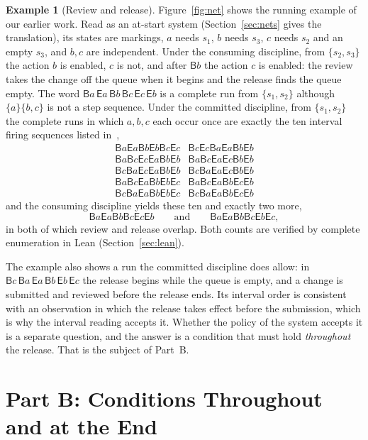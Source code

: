 \documentclass[preprint,12pt]{elsarticle}
\theoremstyle{plain}
\theoremstyle{definition}
\newtheorem{example}[theorem]{Example}
\newcommand{\B}[1]{\mathsf{B}#1}
\newcommand{\E}[1]{\mathsf{E}#1}
\begin{document}
\begin{example}[Review and release]
\label{ex:fig1}
Figure~\ref{fig:net} shows the running example of our earlier work. Read as an at-start system (Section~\ref{sec:nets} gives the translation), its states are markings, $a$ needs $s_1$, $b$ needs $s_3$, $c$ needs $s_2$ and an empty $s_3$, and $b, c$ are independent. Under the consuming discipline, from $\{s_2, s_3\}$ the action $b$ is enabled, $c$ is not, and after $\B{b}$ the action $c$ is enabled: the review takes the change off the queue when it begins and the release finds the queue empty. The word $\B{a}\,\E{a}\,\B{b}\,\B{c}\,\E{c}\,\E{b}$ is a complete run from $\{s_1, s_2\}$ although $\{a\}\{b, c\}$ is not a step sequence. Under the committed discipline, from $\{s_1, s_2\}$ the complete runs in which $a, b, c$ each occur once are exactly the ten interval firing sequences listed in~\cite[Sect.~7]{AlqarniJanicki2018},
\[
\begin{array}{ll}
\B{a}\E{a}\B{b}\E{b}\B{c}\E{c} & \B{c}\E{c}\B{a}\E{a}\B{b}\E{b}\\
\B{a}\B{c}\E{c}\E{a}\B{b}\E{b} & \B{a}\B{c}\E{a}\E{c}\B{b}\E{b}\\
\B{c}\B{a}\E{c}\E{a}\B{b}\E{b} & \B{c}\B{a}\E{a}\E{c}\B{b}\E{b}\\
\B{a}\B{c}\E{a}\B{b}\E{b}\E{c} & \B{a}\B{c}\E{a}\B{b}\E{c}\E{b}\\
\B{c}\B{a}\E{a}\B{b}\E{b}\E{c} & \B{c}\B{a}\E{a}\B{b}\E{c}\E{b}
\end{array}
\]
and the consuming discipline yields these ten and exactly two more,
\[
\B{a}\E{a}\B{b}\B{c}\E{c}\E{b} \qquad\text{and}\qquad \B{a}\E{a}\B{b}\B{c}\E{b}\E{c},
\]
in both of which review and release overlap. Both counts are verified by complete enumeration in Lean (Section~\ref{sec:lean}).
\end{example}

The example also shows a run the committed discipline does allow: in $\B{c}\,\B{a}\,\E{a}\,\B{b}\,\E{b}\,\E{c}$ the release begins while the queue is empty, and a change is submitted and reviewed before the release ends. Its interval order is consistent with an observation in which the release takes effect before the submission, which is why the interval reading accepts it. Whether the policy of the system accepts it is a separate question, and the answer is a condition that must hold \emph{throughout} the release. That is the subject of Part~B.

\section{Part B: Conditions Throughout and at the End}
\label{sec:partB}
\end{document}
